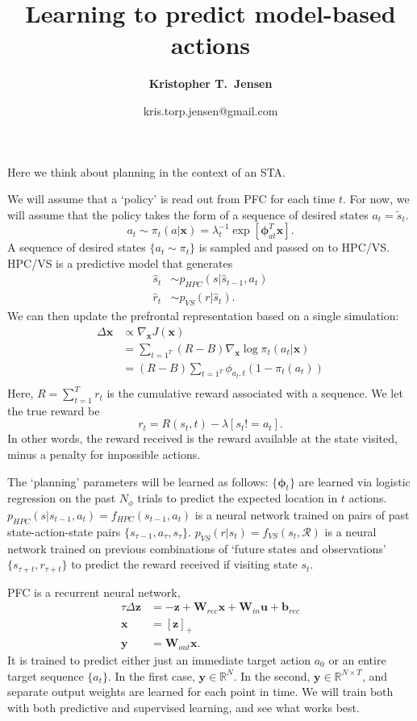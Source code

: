 \documentclass{article}
\title{\Large{Learning to predict model-based actions}}
\author[1]{\normalsize \bfseries Kristopher T.\ Jensen}
\affil[1]{ \small Sainsbury Wellcome Centre, University College London, London, UK}
\date{\vspace*{-2.0em}
\normalsize kris.torp.jensen@gmail.com
}
\renewcommand\b\bm
\begin{document}
\maketitle

Here we think about planning in the context of an STA.

We will assume that a `policy' is read out from PFC for each time $t$.
For now, we will assume that the policy takes the form of a sequence of desired states $a_t = \tilde{s}_t$.
\begin{equation}
    a_t \sim \pi_t(a | \b{x}) = \lambda_t^{-1} \exp \left [ \b{\phi}_{at}^T \b{x}  \right ].
\end{equation}
A sequence of desired states $\{ a_t \sim \pi_t \}$ is sampled and passed on to HPC/VS.
HPC/VS is a predictive model that generates
\begin{align}
    \hat{s}_t &\sim p_{HPC} (s | \hat{s}_{t-1}, a_t)\\
    \hat{r}_t &\sim p_{VS} (r | \hat{s}_t).
\end{align}
We can then update the prefrontal representation based on a single simulation:
\begin{align}
    \Delta \b{x} &\propto \nabla_{\b{x}} J(\b{x}) \\
    &= \sum_{t=1^T} (R - B) \nabla_{\b{x}} \log \pi_t(a_t | \b{x})\\
    &= (R - B) \sum_{t=1^T} \phi_{a_t, t} (1 - \pi_t(a_t)) \\
\end{align}
Here, $R = \sum_{t = 1}^T r_t$ is the cumulative reward associated with a sequence.
We let the true reward be
\begin{equation}
    r_t = R(s_t, t) - \lambda [s_t != a_t].
\end{equation}
In other words, the reward received is the reward available at the state visited, minus a penalty for impossible actions.

The `planning' parameters will be learned as follows:
$\{ \b{\phi}_t \}$ are learned via logistic regression on the past $N_\phi$ trials to predict the expected location in $t$ actions.
$p_{HPC} (s | s_{t-1}, a_t) = f_{HPC}(s_{t-1}, a_t)$ is a neural network trained on pairs of past state-action-state pairs $\{ s_{\tau-1}, a_\tau, s_\tau \}$.
$p_{VS} (r | s_t) = f_{VS}(s_t, \mathcal{R})$ is a neural network trained on previous combinations of `future states and observations' $\{ s_{\tau+t}, r_{\tau+t} \}$ to predict the reward received if visiting state $s_t$.

PFC is a recurrent neural network,
\begin{align}
    \tau \Delta \b{z} &= -\b{z} + \b{W}_{rec} \b{x} + \b{W}_{in} \b{u} + \b{b}_{rec}\\
    \b{x} &= [\b{z}]_+\\
    \b{y} &= \b{W}_{out} \b{x}.
\end{align}
It is trained to predict either just an immediate target action $a_0$ or an entire target sequence $\{ a_t \}$.
In the first case, $\b{y} \in \mathbb{R}^{N}$.
In the second, $\b{y} \in \mathbb{R}^{N \times T}$, and separate output weights are learned for each point in time.
We will train both with both predictive and supervised learning, and see what works best.
\end{document}
